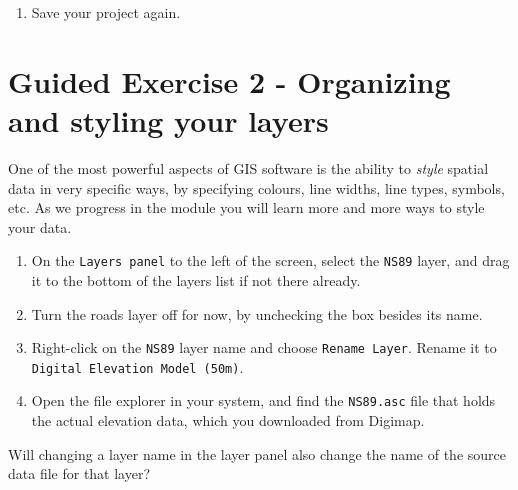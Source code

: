 \documentclass[
  letterpaper,
  DIV=11,
  numbers=noendperiod]{scrreprt}
\providecommand{\tightlist}{%
  \setlength{\itemsep}{0pt}\setlength{\parskip}{0pt}}\usepackage{longtable,booktabs,array}
\begin{document}
\begin{enumerate}
\def\labelenumi{(\arabic{enumi})}
\setcounter{enumi}{12}
\tightlist
\item
  Save your project again.
\end{enumerate}

\section{Guided Exercise 2 - Organizing and styling your
layers}\label{guided-exercise-2---organizing-and-styling-your-layers}

One of the most powerful aspects of GIS software is the ability to
\emph{style} spatial data in very specific ways, by specifying colours,
line widths, line types, symbols, etc. As we progress in the module you
will learn more and more ways to style your data.

\begin{enumerate}
\def\labelenumi{(\arabic{enumi})}
\setcounter{enumi}{13}
\item
  On the \texttt{Layers\ panel} to the left of the screen, select the
  \texttt{NS89} layer, and drag it to the bottom of the layers list if
  not there already.
\item
  Turn the roads layer off for now, by unchecking the box besides its
  name.
\item
  Right-click on the \texttt{NS89} layer name and choose
  \texttt{Rename\ Layer}. Rename it to
  \texttt{Digital\ Elevation\ Model\ (50m)}.
\item
  Open the file explorer in your system, and find the \texttt{NS89.asc}
  file that holds the actual elevation data, which you downloaded from
  Digimap.
\end{enumerate}

\begin{tcolorbox}[enhanced jigsaw, coltitle=black, toprule=.15mm, breakable, opacitybacktitle=0.6, left=2mm, colback=white, leftrule=.75mm, rightrule=.15mm, colbacktitle=quarto-callout-important-color!10!white, toptitle=1mm, titlerule=0mm, colframe=quarto-callout-important-color-frame, arc=.35mm, bottomtitle=1mm, opacityback=0, bottomrule=.15mm, title=\textcolor{quarto-callout-important-color}{\faExclamation}\hspace{0.5em}{Stop and Think}]

Will changing a layer name in the layer panel also change the name of
the source data file for that layer?

\end{tcolorbox}
\end{document}

